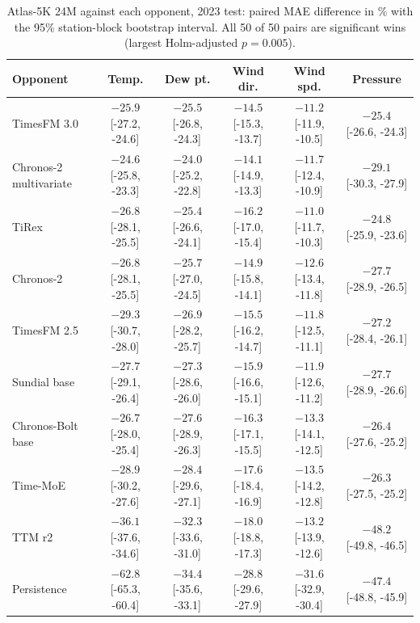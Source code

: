 \begin{table}[H]
\centering\scriptsize
\setlength{\tabcolsep}{2.4pt}
\caption{Atlas-5K 24M against each opponent, 2023 test: paired MAE difference in \% with the 95\% station-block bootstrap interval. All 50 of 50 pairs are significant wins (largest Holm-adjusted $p=0.005$).}
\label{tab:paired_atlas25m_test}
\begin{tabular}{lccccc}
\toprule
Opponent & Temp. & Dew pt. & Wind dir. & Wind spd. & Pressure\\
\midrule
TimesFM 3.0 & $-25.9$ [-27.2, -24.6] & $-25.5$ [-26.8, -24.3] & $-14.5$ [-15.3, -13.7] & $-11.2$ [-11.9, -10.5] & $-25.4$ [-26.6, -24.3]\\
Chronos-2 multivariate & $-24.6$ [-25.8, -23.3] & $-24.0$ [-25.2, -22.8] & $-14.1$ [-14.9, -13.3] & $-11.7$ [-12.4, -10.9] & $-29.1$ [-30.3, -27.9]\\
TiRex & $-26.8$ [-28.1, -25.5] & $-25.4$ [-26.6, -24.1] & $-16.2$ [-17.0, -15.4] & $-11.0$ [-11.7, -10.3] & $-24.8$ [-25.9, -23.6]\\
Chronos-2 & $-26.8$ [-28.1, -25.5] & $-25.7$ [-27.0, -24.5] & $-14.9$ [-15.8, -14.1] & $-12.6$ [-13.4, -11.8] & $-27.7$ [-28.9, -26.5]\\
TimesFM 2.5 & $-29.3$ [-30.7, -28.0] & $-26.9$ [-28.2, -25.7] & $-15.5$ [-16.2, -14.7] & $-11.8$ [-12.5, -11.1] & $-27.2$ [-28.4, -26.1]\\
Sundial base & $-27.7$ [-29.1, -26.4] & $-27.3$ [-28.6, -26.0] & $-15.9$ [-16.6, -15.1] & $-11.9$ [-12.6, -11.2] & $-27.7$ [-28.9, -26.6]\\
Chronos-Bolt base & $-26.7$ [-28.0, -25.4] & $-27.6$ [-28.9, -26.3] & $-16.3$ [-17.1, -15.5] & $-13.3$ [-14.1, -12.5] & $-26.4$ [-27.6, -25.2]\\
Time-MoE & $-28.9$ [-30.2, -27.6] & $-28.4$ [-29.6, -27.1] & $-17.6$ [-18.4, -16.9] & $-13.5$ [-14.2, -12.8] & $-26.3$ [-27.5, -25.2]\\
TTM r2 & $-36.1$ [-37.6, -34.6] & $-32.3$ [-33.6, -31.0] & $-18.0$ [-18.8, -17.3] & $-13.2$ [-13.9, -12.6] & $-48.2$ [-49.8, -46.5]\\
Persistence & $-62.8$ [-65.3, -60.4] & $-34.4$ [-35.6, -33.1] & $-28.8$ [-29.6, -27.9] & $-31.6$ [-32.9, -30.4] & $-47.4$ [-48.8, -45.9]\\
\bottomrule
\end{tabular}
\end{table}
